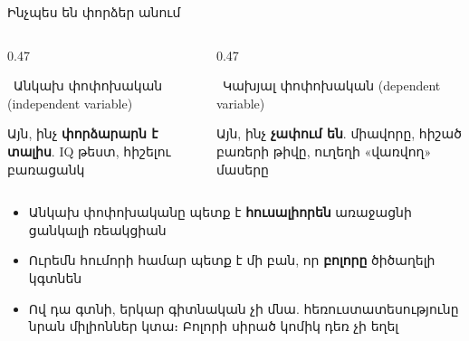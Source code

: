 \begin{frame}{Ինչպես են փորձեր անում}
  \begin{columns}[T]
    \begin{column}{0.47\textwidth}
      \begin{card}[colback=mint!35!cardwhite]
        \ {\blackfont Անկախ փոփոխական} {\scriptsize (independent variable)}\par\smallskip
        Այն, ինչ \textbf{փորձարարն է տալիս}. IQ թեստ, հիշելու բառացանկ
      \end{card}
    \end{column}
    \begin{column}{0.47\textwidth}
      \begin{card}[colback=lavender!35!cardwhite]
        \ {\blackfont Կախյալ փոփոխական} {\scriptsize (dependent variable)}\par\smallskip
        Այն, ինչ \textbf{չափում են}. միավորը, հիշած բառերի թիվը, ուղեղի «վառվող» մասերը
      \end{card}
    \end{column}
  \end{columns}
  \vspace{1mm}
  \begin{itemize}
    \item<2-> Անկախ փոփոխականը պետք է \textbf{հուսալիորեն} առաջացնի ցանկալի ռեակցիան
    \item<3-> Ուրեմն հումորի համար պետք է մի բան, որ \textbf{բոլորը} ծիծաղելի կգտնեն
    \item<4-> Ով դա գտնի, երկար գիտնական չի մնա. հեռուստատեսությունը նրան միլիոններ կտա։ Բոլորի սիրած կոմիկ դեռ չի եղել
  \end{itemize}
\end{frame}

